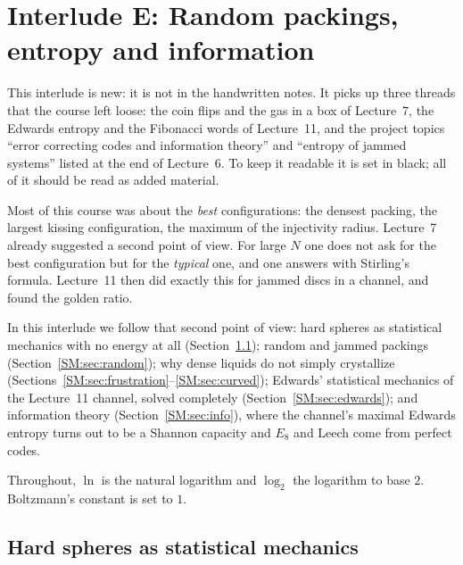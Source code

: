 
\chapter[Interlude E: Entropy and information]{Interlude E: Random packings, entropy and information}
\label{SM:ch}

\begin{addedblock}
This interlude is new: it is not in the handwritten notes. It picks up three threads that the course
left loose: the coin flips and the gas in a box of Lecture~7, the Edwards entropy and the Fibonacci
words of Lecture~11, and the project topics ``error correcting codes and information theory'' and
``entropy of jammed systems'' listed at the end of Lecture~6. To keep it readable it is set in black;
all of it should be read as added material.
\end{addedblock}

Most of this course was about the \emph{best} configurations: the densest packing, the largest
kissing configuration, the maximum of the injectivity radius. Lecture~7 already suggested a second
point of view. For large $N$ one does not ask for the best configuration but for the \emph{typical}
one, and one answers with Stirling's formula. Lecture~11 then did exactly this for jammed discs in a
channel, and found the golden ratio.

In this interlude we follow that second point of view: hard spheres as statistical mechanics with no
energy at all (Section~\ref{SM:sec:hard}); random and jammed packings (Section~\ref{SM:sec:random}); why
dense liquids do not simply crystallize (Sections~\ref{SM:sec:frustration}--\ref{SM:sec:curved}); Edwards'
statistical mechanics of the Lecture~11 channel, solved completely (Section~\ref{SM:sec:edwards}); and
information theory (Section~\ref{SM:sec:info}), where the channel's maximal Edwards entropy turns out to
be a Shannon capacity and $E_8$ and Leech come from perfect codes.

Throughout, $\ln$ is the natural logarithm and $\log_2$ the logarithm to base $2$. Boltzmann's constant
is set to $1$.

\section{Hard spheres as statistical mechanics}
\label{SM:sec:hard}

